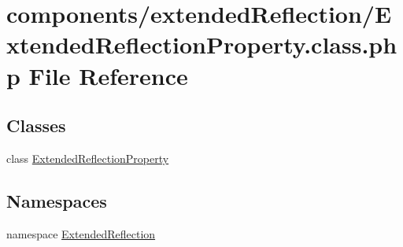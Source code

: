 \hypertarget{_extended_reflection_property_8class_8php}{
\section{components/extendedReflection/ExtendedReflectionProperty.class.php File Reference}
\label{_extended_reflection_property_8class_8php}
}
\subsection*{Classes}
\begin{CompactItemize}
\item 
class \hyperlink{class_extended_reflection_property}{ExtendedReflectionProperty}
\end{CompactItemize}
\subsection*{Namespaces}
\begin{CompactItemize}
\item 
namespace \hyperlink{namespace_extended_reflection}{ExtendedReflection}
\end{CompactItemize}
